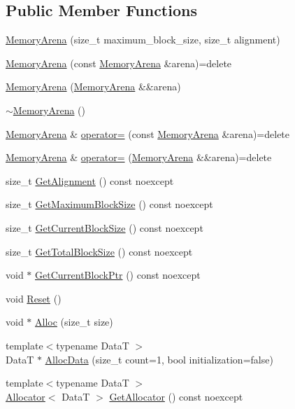 \subsection*{Public Member Functions}
\begin{DoxyCompactItemize}
\item 
\hyperlink{classmage_1_1_memory_arena_a139f7781be209bb29e7ad0ed04cb32a5}{Memory\+Arena} (size\+\_\+t maximum\+\_\+block\+\_\+size, size\+\_\+t alignment)
\item 
\hyperlink{classmage_1_1_memory_arena_a1eca6fdacbd1226f4b21f443d118168b}{Memory\+Arena} (const \hyperlink{classmage_1_1_memory_arena}{Memory\+Arena} \&arena)=delete
\item 
\hyperlink{classmage_1_1_memory_arena_a98829c5a87ba028c376f100cca09e876}{Memory\+Arena} (\hyperlink{classmage_1_1_memory_arena}{Memory\+Arena} \&\&arena)
\item 
\hyperlink{classmage_1_1_memory_arena_acfee6fc205e2eaf6aeef4acf19948e6e}{$\sim$\+Memory\+Arena} ()
\item 
\hyperlink{classmage_1_1_memory_arena}{Memory\+Arena} \& \hyperlink{classmage_1_1_memory_arena_a7e7799f859c55435714933972ecb8b95}{operator=} (const \hyperlink{classmage_1_1_memory_arena}{Memory\+Arena} \&arena)=delete
\item 
\hyperlink{classmage_1_1_memory_arena}{Memory\+Arena} \& \hyperlink{classmage_1_1_memory_arena_aa4b80a917a838a1ca3788f906723d273}{operator=} (\hyperlink{classmage_1_1_memory_arena}{Memory\+Arena} \&\&arena)=delete
\item 
size\+\_\+t \hyperlink{classmage_1_1_memory_arena_a79931a18af492ad8ef7e99b09ec36f2a}{Get\+Alignment} () const noexcept
\item 
size\+\_\+t \hyperlink{classmage_1_1_memory_arena_a6786cf52a03777580b439cafdd8ff8f9}{Get\+Maximum\+Block\+Size} () const noexcept
\item 
size\+\_\+t \hyperlink{classmage_1_1_memory_arena_a0b41d6901c3519f046cd551931f72c1b}{Get\+Current\+Block\+Size} () const noexcept
\item 
size\+\_\+t \hyperlink{classmage_1_1_memory_arena_ac8e8ac4ba60cd2bb1d8dc8a5d4a9f4ad}{Get\+Total\+Block\+Size} () const noexcept
\item 
void $\ast$ \hyperlink{classmage_1_1_memory_arena_a7bdbc9da32c1f8d49ce5d2f153870284}{Get\+Current\+Block\+Ptr} () const noexcept
\item 
void \hyperlink{classmage_1_1_memory_arena_a117b74c7bd5dfb28dfdaae6cab253491}{Reset} ()
\item 
void $\ast$ \hyperlink{classmage_1_1_memory_arena_a2e63b11c535dbfefd69d071466be9ce1}{Alloc} (size\+\_\+t size)
\item 
{\footnotesize template$<$typename DataT $>$ }\\DataT $\ast$ \hyperlink{classmage_1_1_memory_arena_a1e83a02b5f5a74ad29d7a2c7f1f539d0}{Alloc\+Data} (size\+\_\+t count=1, bool initialization=false)
\item 
{\footnotesize template$<$typename DataT $>$ }\\\hyperlink{classmage_1_1_memory_arena_1_1_allocator}{Allocator}$<$ DataT $>$ \hyperlink{classmage_1_1_memory_arena_a722a884e077c903a586a6cb08ce98b24}{Get\+Allocator} () const noexcept
\end{DoxyCompactItemize}
